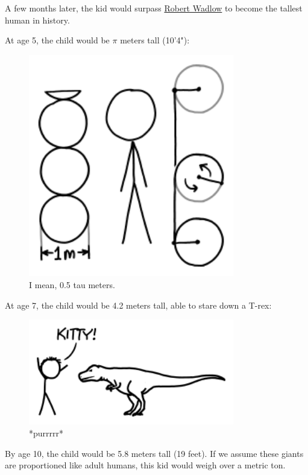 {{A few months later, the kid would surpass \href{https://en.wikipedia.org/wiki/Robert\_Wadlow}{Robert Wadlow} to become the tallest human in history.}

{At age 5, the child would be $\pi $ meters tall (10'4"):}

\begin{figure}[!htbp]
\centering
\includegraphics[scale=0.5, max width=0.8\textwidth]{imgs/a/77/height_5.png}
\caption{I mean, 0.5 tau meters.}
\end{figure}

{At age 7, the child would be 4.2 meters tall, able to stare down a T-rex:}

\begin{figure}[!htbp]
\centering
\includegraphics[scale=0.5, max width=0.8\textwidth]{imgs/a/77/height_7.png}
\caption{*purrrrr*}
\end{figure}

{By age 10, the child would be 5.8 meters tall (19 feet). If we assume these giants are proportioned like adult humans, this kid would weigh over a metric ton.}

}
